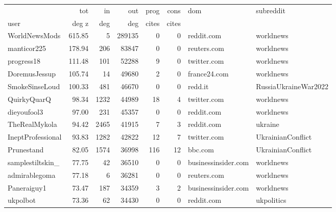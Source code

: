 \begin{tabular}{lrrrrrll}
\toprule
{}   & tot   & in  & out & prog  & cons  & dom & subreddit \\
user & deg z & deg & deg & cites & cites &     &           \\
\midrule
WorldNewsMods     &     615.85 &       5 &   289135 &           0 &           0 &           reddit.com &             worldnews \\
manticor225       &     178.94 &     206 &    83847 &           0 &           0 &          reuters.com &             worldnews \\
progress18        &     111.48 &     101 &    52288 &           9 &           0 &          twitter.com &             worldnews \\
DoremusJessup     &     105.74 &      14 &    49680 &           2 &           0 &         france24.com &             worldnews \\
SmokeSinseLoud    &     100.33 &     481 &    46670 &           0 &           0 &              redd.it &  RussiaUkraineWar2022 \\
QuirkyQuarQ       &      98.34 &    1232 &    44989 &          18 &           4 &          twitter.com &             worldnews \\
dieyoufool3       &      97.00 &     231 &    45357 &           0 &           0 &           reddit.com &             worldnews \\
TheRealMykola     &      94.42 &    2465 &    41915 &           7 &           3 &           reddit.com &               ukraine \\
IneptProfessional &      93.83 &    1282 &    42822 &          12 &           7 &          twitter.com &     UkrainianConflict \\
Prunestand        &      82.05 &    1574 &    36998 &         116 &          12 &              bbc.com &     UkrainianConflict \\
samplestiltskin\_  &      77.75 &      42 &    36510 &           0 &           0 &  businessinsider.com &             worldnews \\
admirablegoma     &      77.18 &       6 &    36281 &           0 &           0 &          reuters.com &             worldnews \\
Paneraiguy1       &      73.47 &     187 &    34359 &           3 &           2 &  businessinsider.com &             worldnews \\
ukpolbot          &      73.36 &      62 &    34430 &           0 &           0 &           reddit.com &            ukpolitics \\

\end{tabular}
